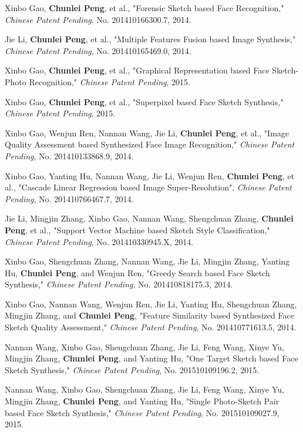 \documentclass[11pt]{article}
\begin{document}
\begin{bibenum}

\item Xinbo Gao, \textbf{Chunlei Peng}, et al., "Forensic Sketch based Face Recognition," \emph{Chinese Patent Pending}, No. 201410166300.7, 2014.

\item Jie Li, \textbf{Chunlei Peng}, et al., "Multiple Features Fusion based Image Synthesis," \emph{Chinese Patent Pending}, No. 201410165469.0, 2014.

\item Xinbo Gao, \textbf{Chunlei Peng}, et al., "Graphical Representation based Face Sketch-Photo Recognition," \emph{Chinese Patent Pending}, 2015.

\item Xinbo Gao, \textbf{Chunlei Peng}, et al., "Superpixel based Face Sketch Synthesis," \emph{Chinese Patent Pending}, 2015.

\item Xinbo Gao, Wenjun Ren, Nannan Wang, Jie Li, \textbf{Chunlei Peng}, et al., "Image Quality Assessment based Synthesized Face Image Recognition," \emph{Chinese Patent Pending}, No. 201410133868.9, 2014.

\item Xinbo Gao, Yanting Hu, Nannan Wang, Jie Li, Wenjun Ren, \textbf{Chunlei Peng}, et al., "Cascade Linear Regression based Image Super-Resolution", \emph{Chinese Patent Pending}, No. 201410766467.7, 2014.

\item Jie Li, Mingjin Zhang, Xinbo Gao, Nannan Wang, Shengchuan Zhang, \textbf{Chunlei Peng}, et al., "Support Vector Machine based Sketch Style Classification," \emph{Chinese Patent Pending}, No. 201410330945.X, 2014.

\item Xinbo Gao, Shengchuan Zhang, Nannan Wang, Jie Li, Mingjin Zhang, Yanting Hu, \textbf{Chunlei Peng}, and Wenjun Ren, "Greedy Search based Face Sketch Synthesis," \emph{Chinese Patent Pending}, No. 201410818175.3, 2014.

\item Xinbo Gao, Nannan Wang, Wenjun Ren, Jie Li, Yanting Hu, Shengchuan Zhang, Mingjin Zhang, and \textbf{Chunlei Peng}, "Feature Similarity based Synthesized Face Sketch Quality Assessment," \emph{Chinese Patent Pending}, No. 201410771613.5, 2014.

\item Nannan Wang, Xinbo Gao, Shengchuan Zhang, Jie Li, Feng Wang, Xinye Yu, Mingjin Zhang, \textbf{Chunlei Peng}, and Yanting Hu, "One Target Sketch based Face Sketch Synthesis," \emph{Chinese Patent Pending}, No. 201510109196.2, 2015.

\item Nannan Wang, Xinbo Gao, Shengchuan Zhang, Jie Li, Feng Wang, Xinye Yu, Mingjin Zhang, \textbf{Chunlei Peng}, and Yanting Hu, "Single Photo-Sketch Pair based Face Sketch Synthesis," \emph{Chinese Patent Pending}, No. 201510109027.9, 2015.

\end{bibenum}
\end{document}
